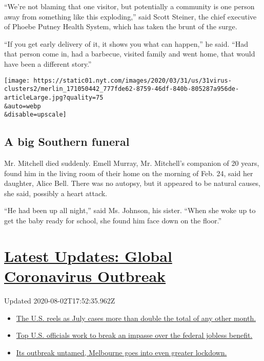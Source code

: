 ``We're not blaming that one visitor, but potentially a community is one
person away from something like this exploding,'' said Scott Steiner,
the chief executive of Phoebe Putney Health System, which has taken the
brunt of the surge.

``If you get early delivery of it, it shows you what can happen,'' he
said. ``Had that person come in, had a barbecue, visited family and went
home, that would have been a different story.''

\texttt{[image: https://static01.nyt.com/images/2020/03/31/us/31virus-clusters2/merlin\_171050442\_777fde62-8759-46df-840b-805287a956de-articleLarge.jpg?quality=75\\\&auto=webp\\\&disable=upscale]}

\hypertarget{a-big-southern-funeral}{%
\subsection{A big Southern funeral}\label{a-big-southern-funeral}}

Mr. Mitchell died suddenly. Emell Murray, Mr. Mitchell's companion of 20
years, found him in the living room of their home on the morning of Feb.
24, said her daughter, Alice Bell. There was no autopsy, but it appeared
to be natural causes, she said, possibly a heart attack.

``He had been up all night,'' said Ms. Johnson, his sister. ``When she
woke up to get the baby ready for school, she found him face down on the
floor.''

\hypertarget{latest-updates-global-coronavirus-outbreak}{%
\section{\texorpdfstring{\href{https://www.nytimes.com/2020/08/01/world/coronavirus-covid-19.html?action=click\&pgtype=Article\&state=default\&region=MAIN_CONTENT_1\&context=storylines_live_updates}{Latest
Updates: Global Coronavirus
Outbreak}}{Latest Updates: Global Coronavirus Outbreak}}\label{latest-updates-global-coronavirus-outbreak}}

Updated 2020-08-02T17:52:35.962Z

\begin{itemize}
\tightlist
\item
  \href{https://www.nytimes.com/2020/08/01/world/coronavirus-covid-19.html?action=click\&pgtype=Article\&state=default\&region=MAIN_CONTENT_1\&context=storylines_live_updates\#link-34047410}{The
  U.S. reels as July cases more than double the total of any other
  month.}
\item
  \href{https://www.nytimes.com/2020/08/01/world/coronavirus-covid-19.html?action=click\&pgtype=Article\&state=default\&region=MAIN_CONTENT_1\&context=storylines_live_updates\#link-780ec966}{Top
  U.S. officials work to break an impasse over the federal jobless
  benefit.}
\item
  \href{https://www.nytimes.com/2020/08/01/world/coronavirus-covid-19.html?action=click\&pgtype=Article\&state=default\&region=MAIN_CONTENT_1\&context=storylines_live_updates\#link-2bc8948}{Its
  outbreak untamed, Melbourne goes into even greater lockdown.}
\end{itemize}

